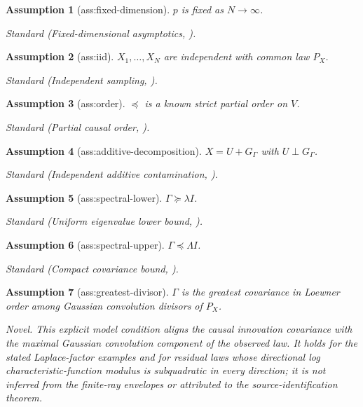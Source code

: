 \documentclass{article}
\newtheorem{assumption}{Assumption}
\begin{document}
\begin{assumption}[ass:fixed-dimension]\label{ass:fixed-dimension}
\(p\) is fixed as \(N\to\infty\).
\par\smallskip\noindent\emph{Standard} (Fixed-dimensional asymptotics, \cite{BelomestnyTrabsTsybakov2019}).
\end{assumption}

\begin{assumption}[ass:iid]\label{ass:iid}
\(X_1,\ldots,X_N\) are independent with common law \(P_X\).
\par\smallskip\noindent\emph{Standard} (Independent sampling, \cite{BelomestnyTrabsTsybakov2019}).
\end{assumption}

\begin{assumption}[ass:order]\label{ass:order}
\(\preceq\) is a known strict partial order on \(V\).
\par\smallskip\noindent\emph{Standard} (Partial causal order, \cite{SanjaroonpouriRamazi2025}).
\end{assumption}

\begin{assumption}[ass:additive-decomposition]\label{ass:additive-decomposition}
\(X=U+G_\Gamma\) with \(U\perp G_\Gamma\).
\par\smallskip\noindent\emph{Standard} (Independent additive contamination, \cite{BelomestnyTrabsTsybakov2019}).
\end{assumption}

\begin{assumption}[ass:spectral-lower]\label{ass:spectral-lower}
\(\Gamma\succeq\lambda I\).
\par\smallskip\noindent\emph{Standard} (Uniform eigenvalue lower bound, \cite{BelomestnyTrabsTsybakov2019}).
\end{assumption}

\begin{assumption}[ass:spectral-upper]\label{ass:spectral-upper}
\(\Gamma\preceq\Lambda I\).
\par\smallskip\noindent\emph{Standard} (Compact covariance bound, \cite{Meister2006}).
\end{assumption}

\begin{assumption}[ass:greatest-divisor]\label{ass:greatest-divisor}
\(\Gamma\) is the greatest covariance in Loewner order among Gaussian convolution divisors of \(P_X\).
\par\smallskip\noindent\emph{Novel.} This explicit model condition aligns the causal innovation covariance with the maximal Gaussian convolution component of the observed law. It holds for the stated Laplace-factor examples and for residual laws whose directional log characteristic-function modulus is subquadratic in every direction; it is not inferred from the finite-ray envelopes or attributed to the source-identification theorem.
\end{assumption}
\end{document}
